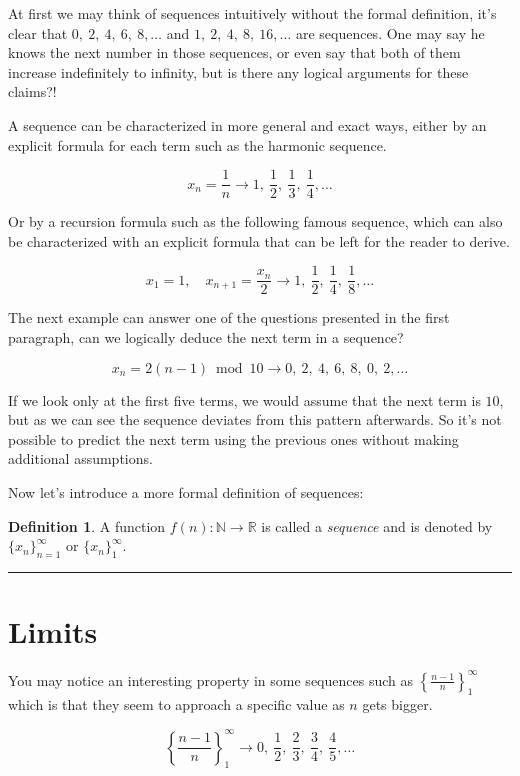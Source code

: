 \documentclass{article}
\theoremstyle{definition}
\newtheorem{definition}{Definition}
\begin{document}
At first we may think of sequences intuitively without the formal definition, it's clear that $0,\ 2,\ 4,\ 6,\ 8,\dots$ and $1,\ 2,\ 4,\ 8,\ 16,\dots$ are sequences. One may say he knows the next number in those sequences, or even say that both of them increase indefinitely to infinity, but is there any logical arguments for these claims?!

A sequence can be characterized in more general and exact ways, either by an explicit formula for each term such as the harmonic sequence.

\[
x_n = \frac{1}n \rightarrow 1,\ \frac{1}2,\ \frac{1}3,\ \frac{1}4,\dots
\]

Or by a recursion formula such as the following famous sequence, which can also be characterized with an explicit formula that can be left for the reader to derive.

\[
x_1 = 1, \quad x_{n+1} = \frac{x_n}{2} \rightarrow 1,\ \frac{1}2,\ \frac{1}4,\ \frac{1}8,\dots
\]

The next example can answer one of the questions presented in the first paragraph, can we logically deduce the next term in a sequence?

\[
x_n = 2(n-1) \bmod 10 \rightarrow 0,\ 2,\ 4,\ 6,\ 8,\ 0,\ 2,\dots
\]

If we look only at the first five terms, we would assume that the next term is $10$, but as we can see the sequence deviates from this pattern afterwards. So it's not possible to predict the next term using the previous ones without making additional assumptions.

Now let's introduce a more formal definition of sequences:

\begin{definition}
A function $f(n): \mathbb{N} \rightarrow \mathbb{R}$ is called a \emph{sequence} and is denoted by $\{x_n\}_{n=1}^\infty$ or $\{x_n\}_{1}^\infty$.
\end{definition}

\bigskip\hrule\bigskip

\section{Limits}

You may notice an interesting property in some sequences such as $\left\{ \frac{n-1}{n} \right\}_1^\infty$ which is that they seem to approach a specific value as $n$ gets bigger.

\[
\left\{ \frac{n-1}{n} \right\}_1^\infty \rightarrow 0,\ \frac{1}2,\ \frac{2}3,\ \frac{3}4,\ \frac{4}5,\dots
\]
\end{document}
